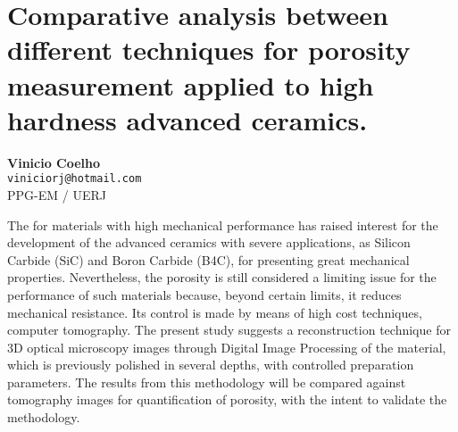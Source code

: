 
\section{Comparative analysis between different techniques for porosity measurement applied to high hardness advanced ceramics.}

\textbf{Vinicio Coelho}\\
\texttt{\small{viniciorj@hotmail.com}}\\
PPG-EM / UERJ

The for materials with high mechanical performance has raised interest for the development of the advanced ceramics with severe applications, as Silicon Carbide (SiC) and Boron Carbide (B4C), for presenting great mechanical properties. Nevertheless, the porosity is still considered a limiting issue for the performance of such materials because, beyond certain limits, it reduces mechanical resistance. Its control is made by means of high cost techniques, computer tomography. The present study suggests a reconstruction technique for 3D optical microscopy images through Digital Image Processing of the material, which is previously polished in several depths, with controlled preparation parameters. The results from this methodology will be compared against tomography images for quantification of porosity, with the intent to validate the methodology.

